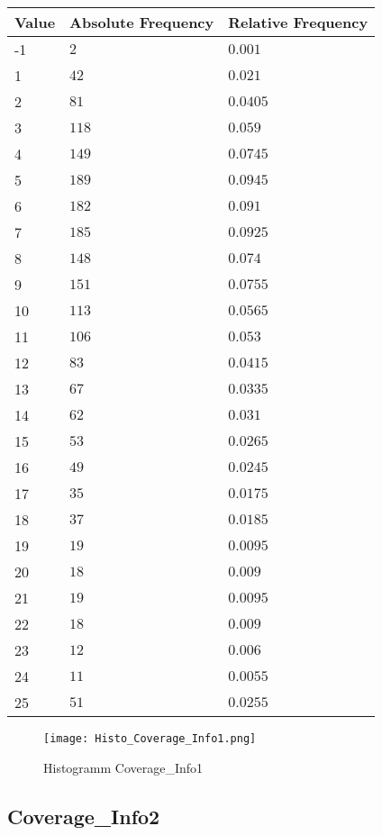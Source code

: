 \begin{table}[H]
	\renewcommand{\arraystretch}{1.25}
	\begin{tabular}{l|l|l}
		\textbf{Value} & \textbf{Absolute Frequency} & \textbf{Relative Frequency}\\\hline
		-1&$2$&$0.001$\\\hline
		1&$42$&$0.021$\\\hline
		2&$81$&$0.0405$\\\hline
		3&$118$&$0.059$\\\hline
		4&$149$&$0.0745$\\\hline
		5&$189$&$0.0945$\\\hline
		6&$182$&$0.091$\\\hline
		7&$185$&$0.0925$\\\hline
		8&$148$&$0.074$\\\hline
		9&$151$&$0.0755$\\\hline
		10&$113$&$0.0565$\\\hline
		11&$106$&$0.053$\\\hline
		12&$83$&$0.0415$\\\hline
		13&$67$&$0.0335$\\\hline
		14&$62$&$0.031$\\\hline
		15&$53$&$0.0265$\\\hline
		16&$49$&$0.0245$\\\hline
		17&$35$&$0.0175$\\\hline
		18&$37$&$0.0185$\\\hline
		19&$19$&$0.0095$\\\hline
		20&$18$&$0.009$\\\hline
		21&$19$&$0.0095$\\\hline
		22&$18$&$0.009$\\\hline
		23&$12$&$0.006$\\\hline
		24&$11$&$0.0055$\\\hline
		25&$51$&$0.0255$
	\end{tabular}
\end{table}

\begin{figure}[H]
	\begin{center}
		\texttt{[image: Histo\_Coverage\_Info1.png]}
	\end{center}
	\caption{Histogramm Coverage\_Info1}
\end{figure}

\subsection{Coverage\_Info2}
